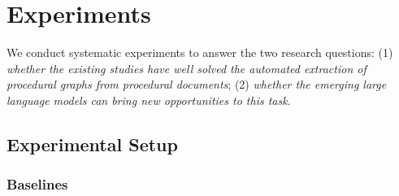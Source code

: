 


\section{Experiments}



We conduct systematic experiments to answer the two research questions: 
(1) \textit{whether the existing studies have well solved the automated extraction of procedural graphs from procedural documents}; (2) \textit{whether the emerging large language models can bring new opportunities to this task}. 

\subsection{Experimental Setup}

\subsubsection{Baselines}

    
